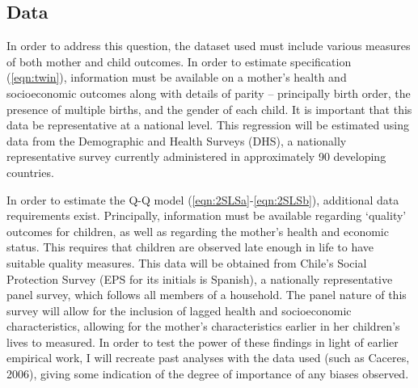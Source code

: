 \documentclass{article}[11pt,subeqn]
\begin{document}
\begin{spacing}{1.25}
\section{Data}
\label{scn:data}
\vspace{-5mm}
In order to address this question, the dataset used must include various measures of both mother and child
outcomes. In order to estimate specification (\ref{eqn:twin}), information must be available on a mother's
health and socioeconomic outcomes along with details of parity -- principally birth order, the presence
of multiple births, and the gender of each child.  It is important that this data be representative at a
national level.  This regression will be estimated using data from the Demographic and Health Surveys (DHS),
a nationally representative survey currently administered in approximately 90 developing countries.

In order to estimate the Q-Q model (\ref{eqn:2SLSa}-\ref{eqn:2SLSb}), additional data requirements exist.  Principally,
information must be available regarding `quality' outcomes for children, as well as regarding the mother's
health and economic status.  This requires that children are observed late enough in life to have suitable
quality measures.  This data will be obtained from Chile's Social Protection Survey (EPS for its initials
is Spanish), a nationally representative panel survey, which follows all members of a household.  The panel
nature of this survey will allow for the inclusion of lagged health and socioeconomic characteristics,
allowing for the mother's characteristics earlier in her children's lives to measured.  In order to test
the power of these findings in light of earlier empirical work, I will recreate past analyses with the
data used (such as Caceres, 2006), giving some indication of the degree of importance of any biases observed.


\end{spacing}
\end{document}
